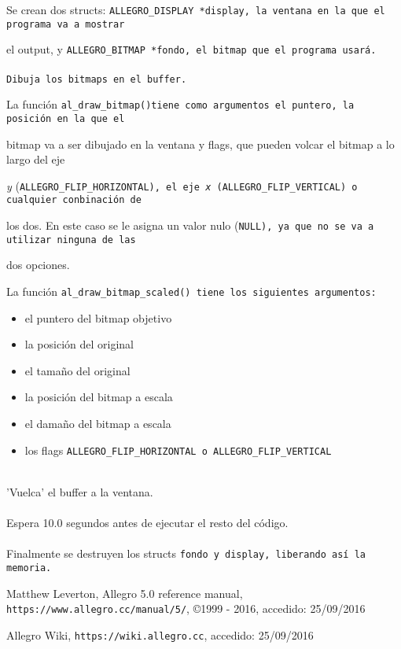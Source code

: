 \documentclass[11pt]{article}
\begin{document}
Se crean dos structs: \tt ALLEGRO\_DISPLAY *display\rm , la ventana en la que el programa va a mostrar

el output, y \tt ALLEGRO\_BITMAP *fondo\rm , el bitmap que el programa usará.\\

\\

Dibuja los bitmaps en el buffer.

La función \tt al\_draw\_bitmap()\rm  tiene como argumentos el puntero, la posición en la que el

bitmap va a ser dibujado en la ventana y flags, que pueden volcar el bitmap a lo largo del eje

\emph{y} (\tt ALLEGRO\_FLIP\_HORIZONTAL\rm), el eje \emph{x} (\tt ALLEGRO\_FLIP\_VERTICAL\rm) o cualquier conbinación de

los dos. En este caso se le asigna un valor nulo (\tt NULL\rm ), ya que no se va a utilizar ninguna de las

dos opciones.

La función \tt al\_draw\_bitmap\_scaled() \rm tiene los siguientes argumentos:
\begin{itemize}
\item el puntero del bitmap objetivo
\item la posición del original
\item el tamaño del original
\item la posición del bitmap a escala
\item el damaño del bitmap a escala
\item los flags \tt ALLEGRO\_FLIP\_HORIZONTAL\rm \ o \tt ALLEGRO\_FLIP\_VERTICAL\rm
\end{itemize}


\\

'Vuelca' el buffer a la ventana.\\

\\

Espera 10.0 segundos antes de ejecutar el resto del código.\\

\\

Finalmente se destruyen los structs \tt fondo \rm y \tt display\rm , liberando así la memoria.
\vfill
\begin{thebibliography}{9}
     Matthew Leverton, 
     Allegro 5.0 reference manual, 
     \verb!https://www.allegro.cc/manual/5/!, 
     \copyright 1999 - 2016,
     accedido: 25/09/2016
     
     Allegro Wiki,
     \verb!https://wiki.allegro.cc!,
     accedido: 25/09/2016
\end{thebibliography}
\end{document}
